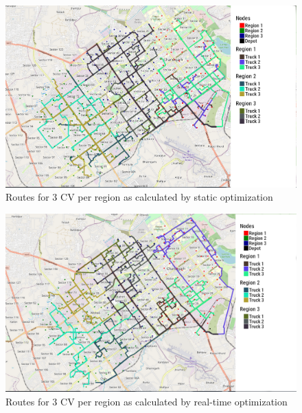 \documentclass[12pt]{article}
\begin{document}
\begin{figure}[H]
    \centering
    \includegraphics[scale=0.3]{Static_Weighted_3_Truck.png} %
    \caption{Routes for 3 CV per region as calculated by static optimization}\label{fig4}
\end{figure}
\begin{figure}[H]
    \centering
    \includegraphics[scale=0.3]{Dynamic_weighted_3_Truck.png} %
    \caption{Routes for 3 CV per region as calculated by real-time optimization}\label{fig5}
\end{figure}
\end{document}
